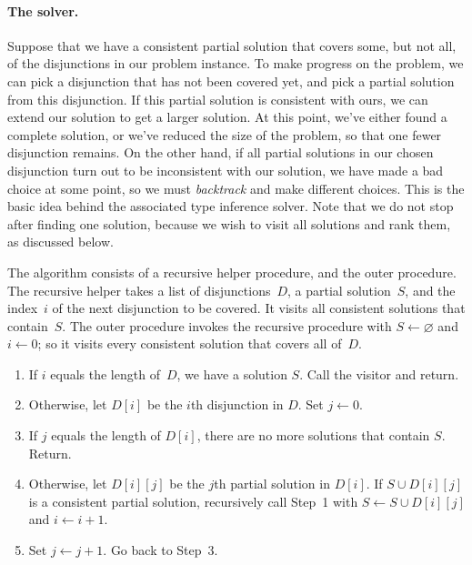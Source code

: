 \documentclass[../generics]{subfiles}
\begin{document}
\paragraph{The solver.}
Suppose that we have a consistent partial solution that covers some, but not all, of the disjunctions in our problem instance. To make progress on the problem, we can pick a disjunction that has not been covered yet, and pick a partial solution from this disjunction. If this partial solution is consistent with ours, we can extend our solution to get a larger solution. At this point, we've either found a complete solution, or we've reduced the size of the problem, so that one fewer disjunction remains. On the other hand, if all partial solutions in our chosen disjunction turn out to be inconsistent with our solution, we have made a bad choice at some point, so we must \emph{backtrack} and make different choices. This is the basic idea behind the associated type inference solver. Note that we do not stop after finding one solution, because we wish to visit all solutions and rank them, as discussed below.

\begin{algorithm}\label{associated type inference algo}
The algorithm consists of a recursive helper procedure, and the outer procedure. The recursive helper takes a list of disjunctions~$D$, a partial solution~$S$, and the index~$i$ of the next disjunction to be covered. It visits all consistent solutions that contain~$S$. The outer procedure invokes the recursive procedure with $S\leftarrow \varnothing$ and $i\leftarrow 0$; so it visits every consistent solution that covers all of~$D$.
\begin{enumerate}
\item If $i$ equals the length of~$D$, we have a solution $S$. Call the visitor and return.
\item Otherwise, let $D[i]$ be the $i$th disjunction in $D$. Set $j\leftarrow 0$.
\item If $j$ equals the length of $D[i]$, there are no more solutions that contain $S$. Return.
\item Otherwise, let $D[i][j]$ be the $j$th partial solution in $D[i]$. If $S \cup D[i][j]$ is a consistent partial solution, recursively call Step~1 with $S\leftarrow S\cup D[i][j]$ and $i\leftarrow i+1$.
\item Set $j\leftarrow j+1$. Go back to Step~3.
\end{enumerate}
\end{algorithm}
\end{document}
